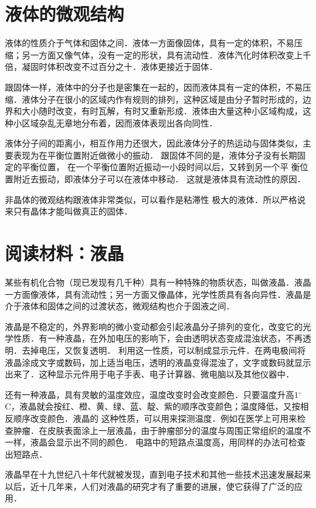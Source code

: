 \section{液体的微观结构}
液体的性质介于气体和固体之间．液体一方面像固体，具有一定的体积，不易压缩；另一方面又像气体，没有一定的形状，具有流动性．液体汽化时体积改变上千倍，凝固时体积改变不过百分之十．液体更接近于固体．

跟固体一样，液体中的分子也是密集在一起的，因而液体具有一定的体积，不易压缩．液体分子在很小的区域内作有规则的排列，这种区域是由分子暂时形成的，边界和大小随时改变，有时瓦解，有时又重新形成．液体由大量这种小区域构成，这种小区域杂乱无章地分布着，因而液体表现出各向同性．

液体分子间的距离小，相互作用力还很大，因此液体分子的热运动与固体类似，主要表现为在平衡位置附近做微小的振动．
跟固体不同的是，液体分子没有长期固定的平衡位置，
在一个平衡位置附近振动一小段时间以后，又转到另一个平
衡位置附近去振动，即液体分子可以在液体中移动．
这就是液体具有流动性的原因．

非晶体的微观结构跟液体非常类似，可以看作是粘滞性
极大的液体．所以严格说来只有晶体才能叫做真正的固体．

\section*{阅读材料：液晶}
某些有机化合物（现已发现有几千种）具有一种特殊的物质状态，叫做液晶．液晶一方面像液体，具有流动性；另一方面又像晶体，光学性质具有各向异性．液晶是介于液体和固体之间的过渡状态，微观结构也介于固液之间．

液晶是不稳定的，外界影响的微小变动都会引起液晶分子排列的变化，改变它的光学性质．有一种液晶，在外加电压的影响下，会由透明状态变成混浊状态，不再透明．去掉电压，又恢复透明．
利用这一性质，可以制成显示元件．在两电极间将液晶涂成文字或数码，加上适当电压，透明的液晶变得混浊了，文字或数码就显示出来了．这种显示元件用于电子手表、电子计算器、微电脑以及其他仪器中．

还有一种液晶，具有灵敏的温度效应，温度改变时会改变颜色．只要温度升高1$^\circ$C，液晶就会按红、橙、黄、绿、蓝、靛、紫的顺序改变颜色；温度降低，又按相反顺序改变颜色．液晶的
这种性质，可以用来探测温度．例如在医学上可用来检查肿瘤．在皮肤表面涂上一层液晶，由于肿瘤部分的温度与周围正常组织的温度不一样，液晶会显示出不同的颜色．
电路中的短路点温度高，用同样的办法可检查出短路点．

液晶早在十九世纪八十年代就被发现，直到电子技术和其他一些技术迅速发展起来以后，近十几年来，人们对液晶的研究才有了重要的进展，使它获得了广泛的应用．

